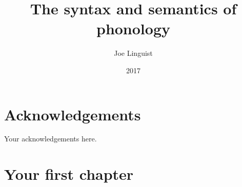 \documentclass[]{msu-thesis}
\title{The syntax and semantics of phonology}
\author{Joe Linguist}
\date{2017}
\begin{document}
\frontmatter
\maketitlepage
\begin{abstract}
\end{abstract}

\clearpage

\makecopyrightpage

%
%
\clearpage
\chapter*{Acknowledgements}
\DoubleSpacing %
Your acknowledgements here.
%
\clearpage
\SingleSpacing
\tableofcontents* %
\clearpage
\listoftables %
\clearpage
\listoffigures %
%
%
\mainmatter
%

\chapter{Your first chapter}


%
%
%
%
%
%
\appendix
\end{document}
